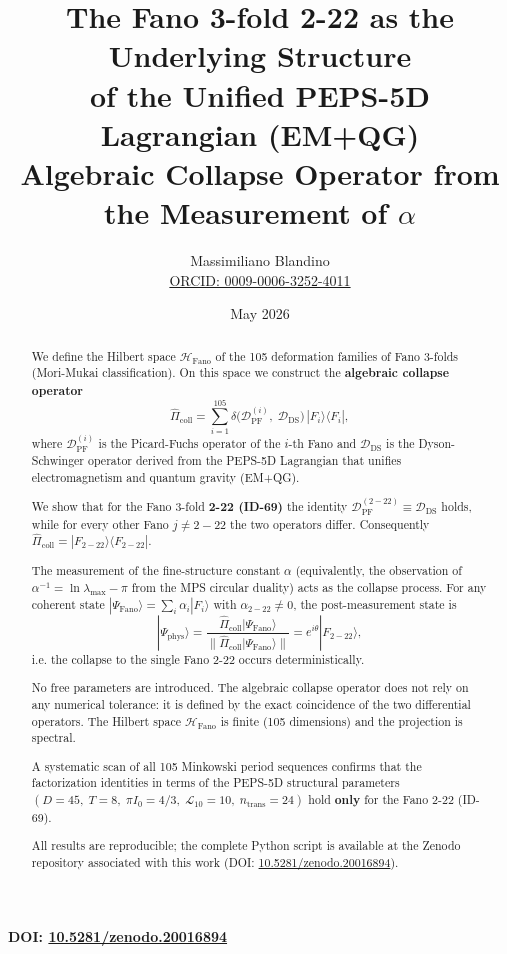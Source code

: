 \documentclass[12pt]{article}
\title{The Fano 3-fold 2-22 as the Underlying Structure \\
       of the Unified PEPS-5D Lagrangian (EM+QG) \\[2pt]
       \large Algebraic Collapse Operator from the Measurement of $\alpha$}
\author{Massimiliano Blandino \\ 
\href{https://orcid.org/0009-0006-3252-4011}{ORCID: 0009-0006-3252-4011}}
\date{May 2026}
\begin{document}
\maketitle

\begin{center}
\large\textbf{DOI: \href{https://doi.org/10.5281/zenodo.20016894}{10.5281/zenodo.20016894}}
\end{center}

\vspace{0.5cm}

\begin{abstract}
We define the Hilbert space \(\mathcal{H}_{\text{Fano}}\) of the 105 deformation families
of Fano 3-folds (Mori-Mukai classification). On this space we construct the
\textbf{algebraic collapse operator}
\[
\hat{\Pi}_{\text{coll}} = \sum_{i=1}^{105} \delta\bigl(\mathcal{D}_{\text{PF}}^{(i)},\; \mathcal{D}_{\text{DS}}\bigr) \, |F_i\rangle\langle F_i|,
\]
where \(\mathcal{D}_{\text{PF}}^{(i)}\) is the Picard-Fuchs operator of the \(i\)-th Fano
and \(\mathcal{D}_{\text{DS}}\) is the Dyson-Schwinger operator derived from the
PEPS-5D Lagrangian that unifies electromagnetism and quantum gravity (EM+QG).

We show that for the Fano 3-fold \textbf{2-22 (ID-69)} the identity
\(\mathcal{D}_{\text{PF}}^{(2-22)} \equiv \mathcal{D}_{\text{DS}}\) holds, while
for every other Fano \(j \neq 2-22\) the two operators differ. Consequently
\(\hat{\Pi}_{\text{coll}} = |F_{2-22}\rangle\langle F_{2-22}|\).

The measurement of the fine-structure constant \(\alpha\) (equivalently, the
observation of \(\alpha^{-1} = \ln\lambda_{\max} - \pi\) from the MPS circular
duality) acts as the collapse process. For any coherent state
\(|\Psi_{\text{Fano}}\rangle = \sum_i \alpha_i |F_i\rangle\) with \(\alpha_{2-22}\neq 0\),
the post-measurement state is
\[
|\Psi_{\text{phys}}\rangle = \frac{ \hat{\Pi}_{\text{coll}} |\Psi_{\text{Fano}}\rangle }
{ \| \hat{\Pi}_{\text{coll}} |\Psi_{\text{Fano}}\rangle \| }
= e^{i\theta} |F_{2-22}\rangle,
\]
i.e. the collapse to the single Fano 2-22 occurs deterministically.

No free parameters are introduced. The algebraic collapse operator does not rely
on any numerical tolerance: it is defined by the exact coincidence of the two
differential operators. The Hilbert space \(\mathcal{H}_{\text{Fano}}\) is finite
(105 dimensions) and the projection is spectral.

A systematic scan of all 105 Minkowski period sequences confirms that the
factorization identities in terms of the PEPS-5D structural parameters
\((D=45,\; T=8,\; \pi I_0 = 4/3,\; \mathcal{L}_{10}=10,\; n_{\text{trans}}=24)\)
hold \textbf{only} for the Fano 2-22 (ID-69).

All results are reproducible; the complete Python script is available at the
Zenodo repository associated with this work
(DOI: \href{https://doi.org/10.5281/zenodo.20016894}{10.5281/zenodo.20016894}).
\end{abstract}
\end{document}
